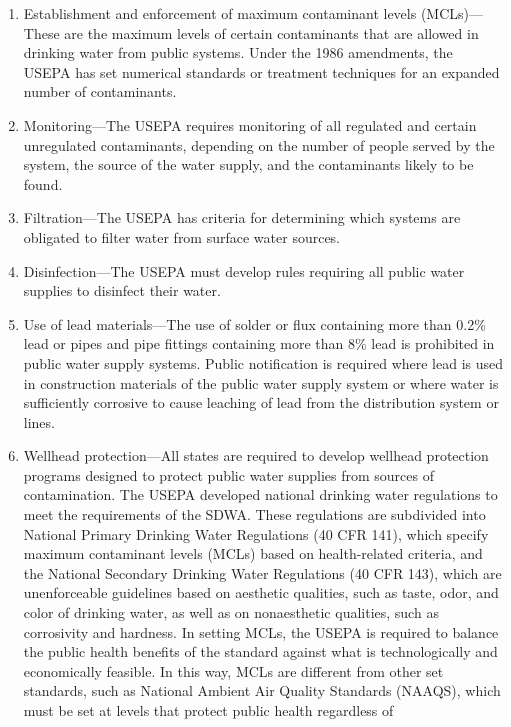\documentclass{article}
\begin{document}
\begin{enumerate}
\def\labelenumi{\arabic{enumi}.}
\tightlist
\item
  Establishment and enforcement of maximum contaminant levels (MCLs)---
  These are the maximum levels of certain contaminants that are allowed
  in drinking water from public systems. Under the 1986 amendments, the
  USEPA has set numerical standards or treatment techniques for an
  expanded number of contaminants.
\item
  Monitoring---The USEPA requires monitoring of all regulated and
  certain unregulated contaminants, depending on the number of people
  served by the system, the source of the water supply, and the
  contaminants likely to be found.
\item
  Filtration---The USEPA has criteria for determining which systems are
  obligated to filter water from surface water sources.
\item
  Disinfection---The USEPA must develop rules requiring all public water
  supplies to disinfect their water.
\item
  Use of lead materials---The use of solder or flux containing more than
  0.2\% lead or pipes and pipe fittings containing more than 8\% lead is
  prohibited in public water supply systems. Public notification is
  required where lead is used in construction materials of the public
  water supply system or where water is sufficiently corrosive to cause
  leaching of lead from the distribution system or lines.
\item
  Wellhead protection---All states are required to develop wellhead
  protection programs designed to protect public water supplies from
  sources of contamination. The USEPA developed national drinking water
  regulations to meet the requirements of the SDWA. These regulations
  are subdivided into National Primary Drinking Water Regulations (40
  CFR 141), which specify maximum contaminant levels (MCLs) based on
  health-related criteria, and the National Secondary Drinking Water
  Regulations (40 CFR 143), which are unenforceable guidelines based on
  aesthetic qualities, such as taste, odor, and color of drinking water,
  as well as on nonaesthetic qualities, such as corrosivity and
  hardness. In setting MCLs, the USEPA is required to balance the public
  health benefits of the standard against what is technologically and
  economically feasible. In this way, MCLs are different from other set
  standards, such as National Ambient Air Quality Standards (NAAQS),
  which must be set at levels that protect public health regardless of

\end{enumerate}
\end{document}
